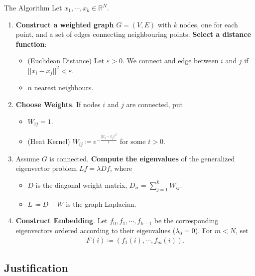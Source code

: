\documentclass[11pt]{beamer}
\begin{document}
\begin{frame}{The Algorithm}
Let $x_1, \cdots, x_k\in\mathbb{R}^N$.
\begin{enumerate}
\item \textbf{Construct a weighted graph} $G=(V, E)$ with $k$ nodes, one for each point, and a set of edges connecting neighbouring points.
\textbf{Select a distance function}:
\begin{itemize}
\item (Euclidean Distance) Let $\varepsilon>0$. We connect and edge between $i$ and $j$ if $||x_i-x_j||^2 < \varepsilon$.
\item $n$ nearest neighbours. 
\end{itemize}
\pause
\item \textbf{Choose Weights}. If nodes $i$ and $j$ are connected, put
\begin{itemize}
\item $W_{ij}=1$.
\item (Heat Kernel) $W_{ij}\coloneqq e^{-\frac{||x_i-x_j||^2}{t}}$ for some $t > 0$.
\end{itemize} 
\pause
\item Assume $G$ is connected. \textbf{Compute the eigenvalues} of the generalized eigenvector problem $Lf = \lambda D f$, where
\begin{itemize}
\item $D$ is the diagonal weight matrix, $D_{ii} = \sum_{j=1}^k W_{ij}$.
\item $L\coloneqq D - W$ is the graph Laplacian. 
\end{itemize}
\pause
\item \textbf{Construct Embedding}. Let $f_0, f_1, \cdots, f_{k-1}$ be the corresponding eigenvectors ordered according to their eigenvalues ($\lambda_0 =0$). For $m<N$, set 
\begin{align*}
F(i)\coloneqq (f_1(i), \cdots, f_{m}(i)).
\end{align*} 
\end{enumerate}
\end{frame}


\subsection{Justification}
\end{document}

